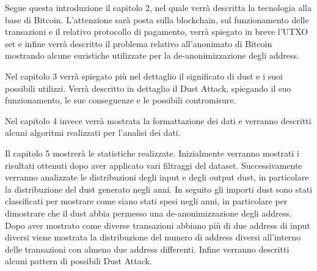 Segue questa introduzione il capitolo 2, nel quale verrà descritta la tecnologia alla base di Bitcoin. L'attenzione sarà posta sulla blockchain, sul funzionamento delle transazioni e il relativo protocollo di pagamento, verrà spiegato in breve l'UTXO set e infine verrà descritto il problema relativo all'anonimato di Bitcoin mostrando alcune euristiche utilizzate per la de-anonimizzazione degli address.

Nel capitolo 3 verrà spiegato più nel dettaglio il significato di dust e i suoi possibili utilizzi. Verrà descritto in dettaglio il Dust Attack, spiegando il suo funzionamento, le sue conseguenze e le possibili contromisure.

Nel capitolo 4 invece verrà mostrata la formattazione dei dati e verranno descritti alcuni algoritmi realizzati per l'analisi dei dati.

Il capitolo 5 mostrerà le statistiche realizzate. Inizialmente verranno mostrati i risultati ottenuti dopo aver applicato vari filtraggi del dataset. Successivamente verranno analizzate le distribuzioni degli input e degli output dust, in particolare la distribuzione del dust generato negli anni. In seguito gli importi dust sono stati classificati per mostrare come siano stati spesi negli anni, in particolare per dimostrare che il dust abbia permesso una de-anonimizzazione degli address. Dopo aver mostrato come diverse transazioni abbiano più di due address di input diversi viene mostrata la distribuzione del numero di address diversi all'interno delle transazioni con almeno due address differenti. Infine verranno descritti alcuni pattern di possibili Dust Attack.
